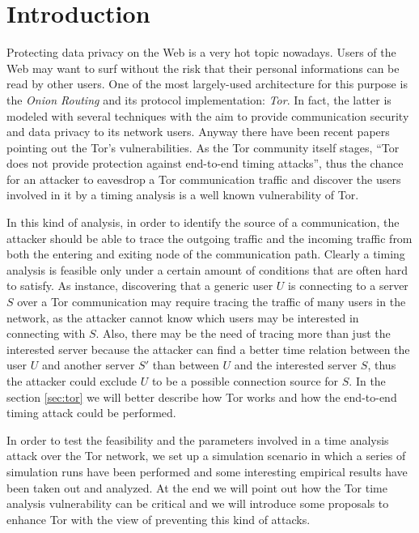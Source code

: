 \section{Introduction}
Protecting data privacy on the Web is a very hot topic nowadays. 
Users of the Web may want to surf without the risk that their personal
informations can be read by other users. %
One of the most largely-used
architecture for this purpose is the \emph{Onion Routing} and its
protocol implementation: \emph{Tor}\cite{dingledine2004tor}. In fact, the latter is modeled with
several techniques with the aim to provide communication security and
data privacy to its network users. Anyway there have been recent papers
 pointing out the Tor's vulnerabilities. %
 As the Tor community itself stages, ``Tor does not provide protection
 against end-to-end timing attacks''\cite{toroverview}, thus the
 chance for an attacker to eavesdrop a Tor communication traffic and
 discover the users involved in it by a
 timing analysis is a well known vulnerability of Tor. 
 
 In this kind of analysis, in order to
 identify the source of a communication, the attacker should be able to
 trace the outgoing traffic and the incoming traffic from both the
 entering and exiting node of the communication path.
 Clearly a timing analysis is feasible only under a certain amount of
 conditions that are often hard to satisfy. As instance, discovering
 that a generic user $U$ is connecting to a server $S$ over a Tor
 communication may require tracing the traffic of many users in the
 network, as the
 attacker cannot know which users may be interested in connecting with
 $S$. Also, there may be the need of tracing more than just the
 interested server because the attacker can find a better time
 relation between the user $U$ and another server $S'$ than between $U$
 and the interested server $S$, thus the attacker could exclude $U$ to be a possible
 connection source for $S$.
 In the section
 \ref{sec:tor} we will better describe how Tor works and how the
 end-to-end timing attack could be performed.
 
 In order to test the feasibility and the parameters involved in
 a time analysis attack over the Tor network, we set up a simulation
 scenario in which a series of simulation runs have been performed and some interesting
 empirical results have been taken out and analyzed.
 At the end we will point out how the Tor time analysis vulnerability can be
 critical and we will introduce some proposals to enhance Tor with the
 view of preventing this kind of attacks. %
 
